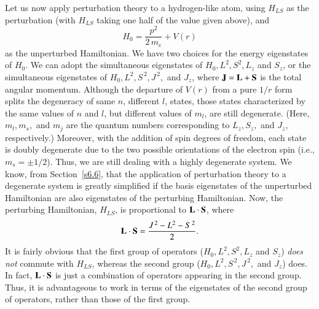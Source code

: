 Let us now apply perturbation theory to a hydrogen-like atom, using $H_{LS}$
as the perturbation (with $H_{LS}$ taking one half of the value given above), and
\begin{equation}
H_0 = \frac{{p}^2}{2\,m_e} + V(r)
\end{equation}
as the unperturbed Hamiltonian. We have two choices for the energy
eigenstates of $H_0$. We can adopt the simultaneous eigenstates of 
$H_0, L^2, S^2, L_z$ and $S_z$, or the simultaneous eigenstates of
$H_0, L^2, S^{\,2}, J^{\,2},$ and $J_z$, where ${\bf J} = {\bf L} + {\bf S}$ is
the total angular momentum. Although the departure of $V(r)$ from a pure
$1/r$ form splits the degeneracy of  same $n$, different $l$, states,
those states characterized by the same values of $n$ and $l$, but different
values of $m_l$, are still degenerate.
(Here, $m_l, m_s,$ and $m_j$ are the quantum numbers
corresponding to $L_z, S_z,$ and $J_z$, respectively.)
 Moreover, with the addition of spin
degrees of freedom, each state is doubly degenerate due to the two possible
orientations of the electron spin ({\rm i.e.}, $m_s = \pm 1/2$). Thus, we are still
dealing with a
highly degenerate system. We know, from Section~\ref{s6.6}, that the application of
perturbation theory to a degenerate system is greatly simplified if the
basis eigenstates of the unperturbed Hamiltonian are also eigenstates
of the perturbing Hamiltonian. Now, the perturbing Hamiltonian,
$H_{LS}$, is proportional to ${\bf L}\cdot {\bf S}$, where
\begin{equation}\label{e6.103}
{\bf L} \cdot{\bf S} = \frac{J^{\,2} - L^2 - S^{\,2}}{2}.
\end{equation}
It is fairly obvious
 that the first group of operators ($H_0, L^2, S^2, L_z$ and $S_z$)
{\em does not}\/ commute with $H_{LS}$,  whereas the second group
($H_0, L^2, S^{\,2}, J^{\,2},$ and $J_z$) does. In fact, ${\bf L} \cdot{\bf S}$
is just a combination of operators appearing in the second group. Thus, it is
advantageous to work in terms of the eigenstates of the second group of
operators, rather than those of the first group.

